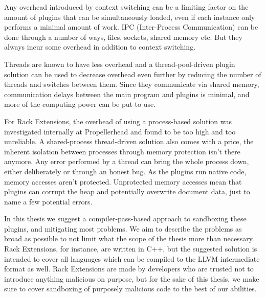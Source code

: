 Any overhead introduced by context switching can be a limiting factor on the
amount of plugins that can be simultaneously loaded, even if each instance only
performs a minimal amount of work. IPC (Inter-Process Communication) can be done
through a number of ways, files, sockets, shared memory etc. But they always
incur some overhead in addition to context switching.

Threads are known to have less overhead and a thread-pool-driven plugin
solution can be used to decrease overhead even further by reducing the number of
threads and switches between them. Since they communicate via shared memory,
communication delays between the main program and plugins is minimal, and more
of the computing power can be put to use.

For Rack Extensions, the overhead of using a process-based solution was
investigated internally at Propellerhead and found to be too high and too
unreliable. A shared-process thread-driven solution also comes with a price, the
inherent isolation between processes through memory protection isn't there
anymore. Any error performed by a thread can bring the whole process down,
either deliberately or through an honest bug. As the plugins run native code,
memory accesses aren't protected. Unprotected memory accesses mean that plugins
can corrupt the heap and potentially overwrite document data, just to name a
few potential errors.

In this thesis we suggest a compiler-pass-based approach to sandboxing these
plugins, and mitigating most problems. We aim to describe the problems as broad
as possible to not limit what the scope of the thesis more than necessary. Rack
Extensions, for instance, are written in C++, but the suggested solution is
intended to cover all languages which can be compiled to the LLVM intermediate
format as well. Rack Extensions are made by developers who are trusted not to
introduce anything malicious on purpose, but for the sake of this thesis, we
make sure to cover sandboxing of purposely malicious code to the best of our
abilities.
